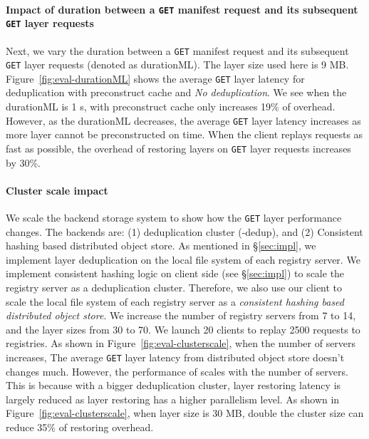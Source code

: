 \paragraph{Impact of duration between a \texttt{GET} manifest request and its subsequent \texttt{GET} layer requests}
Next, 
we vary 
the duration between a \texttt{GET} manifest request and its subsequent \texttt{GET} layer requests (denoted as durationML).
The layer size used here is 9 MB.
%
Figure~\ref{fig:eval-durationML} shows 
the average \texttt{GET} layer latency for \sysname deduplication with preconstruct cache and 
\emph{No deduplication}.
We see when the durationML is 1 s, 
\sysname with preconstruct cache only increases 19\% of overhead.
However, as the durationML decreases,
the average \texttt{GET} layer latency increases as more layer cannot be preconstructed on time.
When the client replays requests as fast as possible,
the overhead of restoring layers on \texttt{GET} layer requests increases by 30\%.


\paragraph{Cluster scale impact}
We scale the backend storage system 
to show how the \texttt{GET} layer performance changes.
 The backends are:
 (1) \sysname deduplication cluster (\sysname-dedup),
 and
 (2) Consistent hashing based distributed object store. 
 As mentioned in \S\ref{sec:impl},
 we implement layer deduplication on the
 local file system of each registry server.
We implement consistent hashing logic on client side (see \S\ref{sec:impl}) to
 scale the registry server as a deduplication cluster.
Therefore,
we also use our client to scale the local file system of each registry server
as a \emph{ consistent hashing based distributed object store}.
We increase the number of registry servers from 7 to 14,
and the layer sizes from 30 to 70.
We launch 20 clients to replay 2500 requests to registries.
%
As shown in Figure~\ref{fig:eval-clusterscale},
when the number of servers increases,
The average \texttt{GET} layer latency from
distributed object store doesn't changes much.
However, the performance of \sysname scales with the number of servers.
This is because with a bigger deduplication cluster,
 layer restoring latency is largely reduced as 
 layer restoring has a higher parallelism level.
 As shown in Figure~\ref{fig:eval-clusterscale},
 when layer size is 30 MB,
 double the cluster size can reduce 35\% of restoring overhead.

